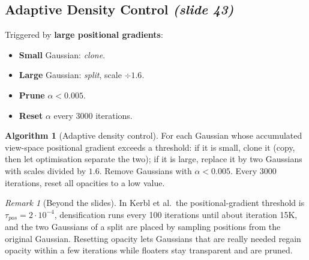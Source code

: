 \documentclass[11pt,a4paper]{article}
\newcommand{\sr}[1]{\texorpdfstring{\emph{(#1)}}{(#1)}}
\theoremstyle{definition}
\newtheorem{algorithm}{Algorithm}[section]
\theoremstyle{plain}
\theoremstyle{remark}
\newtheorem{remark}[definition]{Remark}
\begin{document}
\subsection{Adaptive Density Control \sr{slide 43}}
Triggered by \textbf{large positional gradients}:
\begin{itemize}[nosep]
\item \textbf{Small} Gaussian: \emph{clone}.
\item \textbf{Large} Gaussian: \emph{split}, scale $\div1.6$.
\item \textbf{Prune} $\alpha<0.005$.
\item \textbf{Reset} $\alpha$ every 3000 iterations.
\end{itemize}

\begin{algorithm}[Adaptive density control]
For each Gaussian whose accumulated view-space positional gradient exceeds a threshold: if it is small, clone it (copy, then let optimisation separate the two); if it is large, replace it by two Gaussians with scales divided by $1.6$. Remove Gaussians with $\alpha<0.005$. Every 3000 iterations, reset all opacities to a low value.
\end{algorithm}

\begin{remark}[Beyond the slides]
In Kerbl et al.\ the positional-gradient threshold is $\tau_{pos}=2\cdot10^{-4}$, densification runs every 100 iterations until about iteration 15K, and the two Gaussians of a split are placed by sampling positions from the original Gaussian. Resetting opacity lets Gaussians that are really needed regain opacity within a few iterations while floaters stay transparent and are pruned.
\end{remark}
\end{document}
